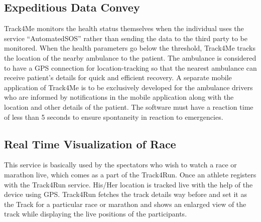 \subsection{Expeditious Data Convey}
\qquad Track4Me monitors the health status themselves when the individual uses the service “AutomatedSOS” rather than sending the data to the third party to be monitored. When the health parameters go below the threshold, Track4Me tracks the location of the nearby ambulance to the patient. The ambulance is considered to have a GPS connection for location-tracking so that the nearest ambulance can receive patient’s details for quick and efficient recovery. A separate mobile application of Track4Me is to be exclusively developed for the ambulance drivers who are informed by notifications in the mobile application along with the location and other details of the patient. The software must have a reaction time of less than 5 seconds to ensure spontaneity in reaction to emergencies. 


\subsection{Real Time Visualization of Race}
\qquad This service is basically used by the spectators who wish to watch a race or marathon live, which comes as a part of the Track4Run. Once an athlete registers with the Track4Run service. His/Her location is tracked live with the help of the device using GPS. Track4Run fetches the track details way before and set it as the Track for a particular race or marathon and shows an enlarged view of the track while displaying the live positions of the participants.